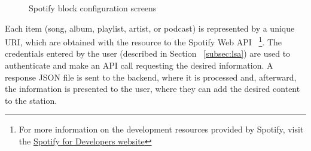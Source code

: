 \begin{figure}[htbp]
	\centering
	 \qquad
	 \qquad
	\caption{Spotify block configuration screens}
	\label{fig:spp1}
\end{figure}

Each item (song, album, playlist, artist, or podcast) is represented by a unique \ac{URI}, which are obtained with the resource to the Spotify Web \ac{API} ~\footnote{For more information on the development resources provided by Spotify, visit the \href{https://developer.spotify.com/documentation/web-api/}{Spotify for Developers website}}. The credentials entered by the user (described in Section ~\ref{subsec:lsa}) are used to authenticate and make an API call requesting the desired information. A response JSON file is sent to the backend, where it is processed and, afterward, the information is presented to the user, where they can add the desired content to the station.

